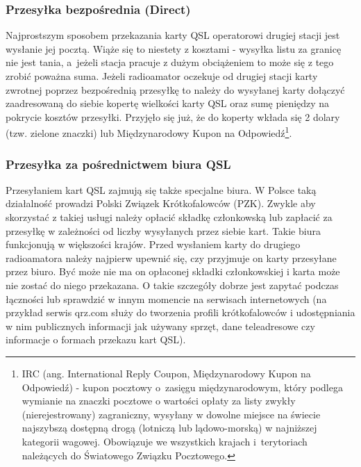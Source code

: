 \documentclass[]{mgr}
\begin{document}
                \subsubsection{Przesyłka bezpośrednia (Direct)}
                Najprostszym sposobem przekazania karty QSL operatorowi drugiej stacji jest wysłanie jej pocztą. Wiąże się to niestety z kosztami - wysyłka listu za granicę nie jest tania, a~jeżeli stacja pracuje z dużym obciążeniem to może się z tego zrobić poważna suma. Jeżeli radioamator oczekuje od drugiej stacji karty zwrotnej poprzez bezpośrednią przesyłkę to należy do wysyłanej karty dołączyć zaadresowaną do siebie kopertę wielkości karty QSL oraz sumę pieniędzy na pokrycie kosztów przesyłki. Przyjęło się już, że do koperty wkłada się 2 dolary (tzw. zielone znaczki) lub Międzynarodowy Kupon na Odpowiedź\footnote{IRC (ang. International Reply Coupon, Międzynarodowy Kupon na Odpowiedź) - kupon pocztowy o~zasięgu międzynarodowym, który podlega wymianie na znaczki pocztowe o wartości opłaty za listy zwykły (nierejestrowany) zagraniczny, wysyłany w dowolne miejsce na świecie najszybszą dostępną drogą (lotniczą lub lądowo-morską) w najniższej kategorii wagowej. Obowiązuje we wszystkich krajach i~terytoriach należących do Światowego Związku Pocztowego.}.

                \subsubsection{Przesyłka za pośrednictwem biura QSL}
                Przesyłaniem kart QSL zajmują się także specjalne biura. W Polsce taką działalność prowadzi Polski Związek Krótkofalowców (PZK). Zwykle aby skorzystać z takiej usługi należy opłacić składkę członkowską lub zapłacić za przesyłkę w zależności od liczby wysyłanych przez siebie kart. Takie biura funkcjonują w większości krajów. Przed wysłaniem karty do drugiego radioamatora należy najpierw upewnić się, czy przyjmuje on karty przesyłane przez biuro. Być może nie ma on opłaconej składki członkowskiej i karta może nie zostać do niego przekazana. O takie szczegóły dobrze jest zapytać podczas łączności lub sprawdzić w innym momencie na serwisach internetowych (na przykład serwis qrz.com służy do tworzenia profili krótkofalowców i udostępniania w nim publicznych informacji jak używany sprzęt, dane teleadresowe czy informacje o formach przekazu kart QSL).
\end{document}
